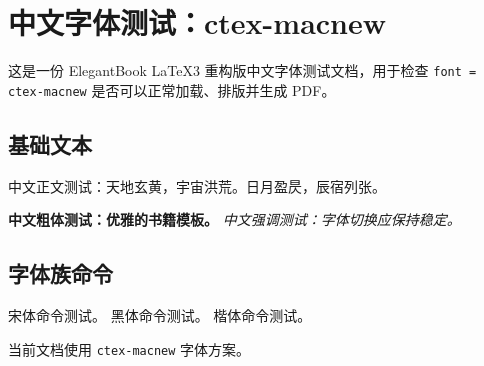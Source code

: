 \documentclass[lang = cn, font = ctex-macnew, mode = simple]{elegantbook-l3}
\begin{document}
\frontmatter
\tableofcontents

\mainmatter
\chapter{中文字体测试：ctex-macnew}

这是一份 ElegantBook LaTeX3 重构版中文字体测试文档，用于检查
\texttt{font = ctex-macnew} 是否可以正常加载、排版并生成 PDF。

\section{基础文本}

中文正文测试：天地玄黄，宇宙洪荒。日月盈昃，辰宿列张。

\textbf{中文粗体测试：优雅的书籍模板。}
\emph{中文强调测试：字体切换应保持稳定。}

\section{字体族命令}

{\songti 宋体命令测试。}
{\heiti 黑体命令测试。}
{\kaishu 楷体命令测试。}

\begin{theorem}[字体方案]
  当前文档使用 \texttt{ctex-macnew} 字体方案。
\end{theorem}
\end{document}

